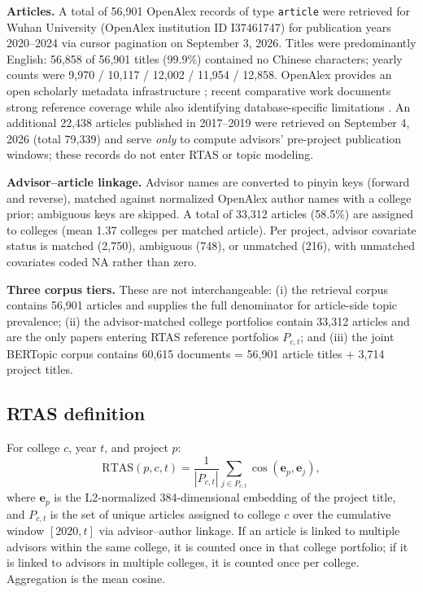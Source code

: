 \documentclass[11pt]{article}
\begin{document}
\textbf{Articles.} A total of 56,901 OpenAlex records of type \texttt{article} were retrieved for Wuhan University (OpenAlex institution ID I37461747) for publication years 2020--2024 via cursor pagination on September 3, 2026. Titles were predominantly English: 56,858 of 56,901 titles (99.9\%) contained no Chinese characters; yearly counts were 9,970 / 10,117 / 12,002 / 11,954 / 12,858. OpenAlex provides an open scholarly metadata infrastructure \citep{priem2022openalex}; recent comparative work documents strong reference coverage while also identifying database-specific limitations \citep{culbert2025openalex}. An additional 22,438 articles published in 2017--2019 were retrieved on September 4, 2026 (total 79,339) and serve \emph{only} to compute advisors' pre-project publication windows; these records do not enter RTAS or topic modeling.

\textbf{Advisor--article linkage.} Advisor names are converted to pinyin keys (forward and reverse), matched against normalized OpenAlex author names with a college prior; ambiguous keys are skipped. A total of 33,312 articles (58.5\%) are assigned to colleges (mean 1.37 colleges per matched article). Per project, advisor covariate status is matched (2,750), ambiguous (748), or unmatched (216), with unmatched covariates coded NA rather than zero.

\textbf{Three corpus tiers.} These are not interchangeable: (i) the retrieval corpus contains 56,901 articles and supplies the full denominator for article-side topic prevalence; (ii) the advisor-matched college portfolios contain 33,312 articles and are the only papers entering RTAS reference portfolios $P_{c,t}$; and (iii) the joint BERTopic corpus contains 60,615 documents = 56,901 article titles + 3,714 project titles.

\subsection{RTAS definition}

For college $c$, year $t$, and project $p$:
\begin{equation}
\mathrm{RTAS}(p,c,t)=
\frac{1}{|P_{c,t}|}
\sum_{j\in P_{c,t}}
\cos(\mathbf e_p,\mathbf e_j),
\end{equation}
where $\mathbf e_p$ is the L2-normalized 384-dimensional embedding of the project title, and $P_{c,t}$ is the set of unique articles assigned to college $c$ over the cumulative window $[2020,t]$ via advisor--author linkage. If an article is linked to multiple advisors within the same college, it is counted once in that college portfolio; if it is linked to advisors in multiple colleges, it is counted once per college. Aggregation is the mean cosine.
\end{document}
